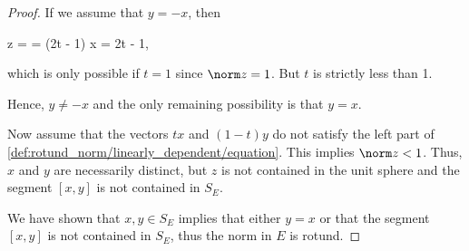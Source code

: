 \begin{proof}
  If we assume that \( y = -x \), then
  \begin{balign*}
    \norm z
    =
    =
    (2t - 1) \norm x
    =
    2t - 1,
  \end{balign*}
  which is only possible if \( t = 1 \) since \( \norm z = 1 \). But \( t \) is strictly less than 1.

  Hence, \( y \neq -x \) and the only remaining possibility is that \( y = x \).

  Now assume that the vectors \( tx \) and \( (1-t)y \) do not satisfy the left part of \cref{def:rotund_norm/linearly_dependent/equation}. This implies \( \norm z < 1 \). Thus, \( x \) and \( y \) are necessarily distinct, but \( z \) is not contained in the unit sphere and the segment \( [x, y] \) is not contained in \( S_E \).

  We have shown that \( x, y \in S_E \) implies that either \( y = x \) or that the segment \( [x, y] \) is not contained in \( S_E \), thus the norm in \( E \) is rotund.
\end{proof}


